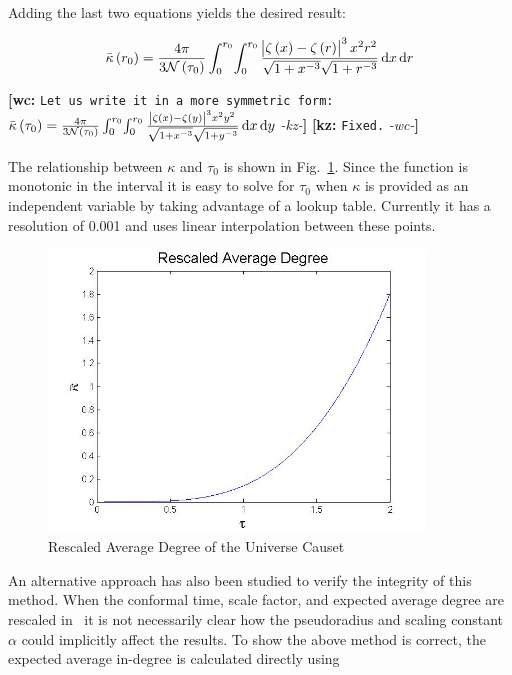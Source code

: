 \documentclass[preprint,notitlepage,amsmath,amssymb,floatfix]{revtex4-1}
\newcommand{\XXX}[3]{{\bf [#1: } {\tt #3} {\it -#2-}{\bf ]}}
\begin{document}
\noindent Adding the last two equations yields the desired result:

\begin{equation}
\label{eq:kappa}
\bar\kappa\left(r_0\right) = \frac{4\pi}{3\mathcal{N}\left(\tau_0\right)}\int_0^{r_0} \! \int_0^{r_0} \frac{\abs{\zeta\left(x\right) - \zeta\left(r\right)}^3 x^2 r^2}{\sqrt{1+x^{-3}}\sqrt{1+r^{-3}}}\,\mathrm dx\,\mathrm dr
\end{equation}

\XXX{wc}{kz}{Let us write it in a more symmetric form: 
	$\bar\kappa\left(\tau_0\right) = \frac{4\pi}{3\mathcal{N}\left(\tau_0\right)}\int_0^{r_0} \! \int_0^{r_0} \frac{\abs{\zeta\left(x\right) - \zeta\left(y\right)}^3 x^2 y^2 }{\sqrt{1+x^{-3}}\sqrt{1+y^{-3}}}\,\mathrm dx\,\mathrm dy$} \XXX{kz}{wc}{Fixed.}

\noindent The relationship between $\kappa$ and $\tau_0$ is shown in Fig.~\ref{fig:kappa_tau}.
Since the function is monotonic in the interval it is easy to solve for $\tau_0$ when $\kappa$ is provided as an independent variable by taking advantage of a lookup table.  
Currently it has a resolution of 0.001 and uses linear interpolation between these points.

\begin{figure}
\includegraphics[width=10cm]{figures/Rescaled_Average_Degree.jpg}
\caption{Rescaled Average Degree of the Universe Causet}
\label{fig:kappa_tau}
\centering
\end{figure}

An alternative approach has also been studied to verify the integrity of this method.
When the conformal time, scale factor, and expected average degree are rescaled in~\cite{ref:snc2012} it is not necessarily clear how the pseudoradius and scaling constant $\alpha$ could implicitly affect the results.
To show the above method is correct, the expected average in-degree is calculated directly using
\end{document}
